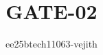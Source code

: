 \documentclass[journal]{IEEEtran}
\begin{document}

\vspace{3cm}

\title{GATE-02}
\author{ee25btech11063-vejith}


\maketitle
{\let\newpage\relax\maketitle}

\renewcommand{\thefigure}{\theenumi}
\renewcommand{\thetable}{\theenumi}
\setlength{\intextsep}{10pt} %
\end{document}
